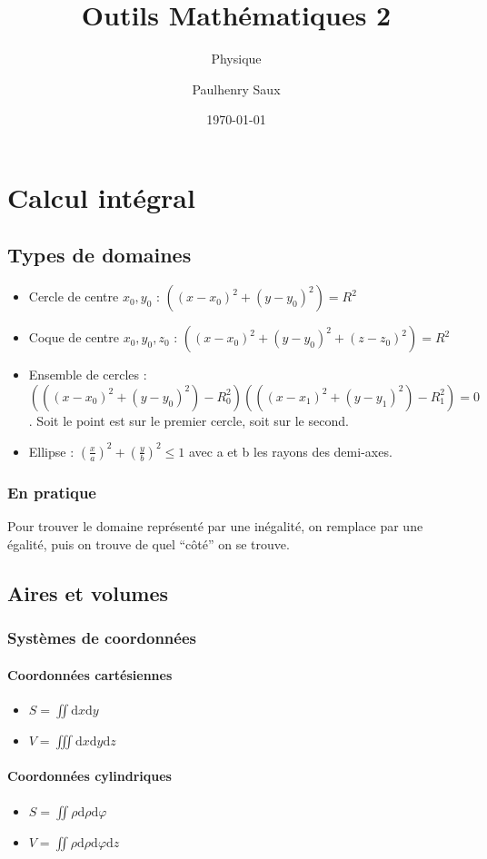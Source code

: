 \documentclass[french]{yLectureNote}
\title{Outils Mathématiques 2}
\subtitle{Physique}
\author{Paulhenry Saux}
\date{\today}
\newcommand{\dd}{\mathrm{d}}
\begin{document}
\setcounter{chapter}{1}
\chapter{Calcul intégral}
\section{Types de domaines}
\begin{itemize}
 \item Cercle de centre \(x_0, y_0\) : \(((x-x_0)^2+(y-y_0)^2) = R^2\)
  \item Coque de centre \(x_0, y_0, z_0\) : \(((x-x_0)^2+(y-y_0)^2+(z-z_0)^2) = R^2\)
  \item Ensemble de cercles : \((((x-x_0)^2+(y-y_0)^2)-R_0^2)(((x-x_1)^2+(y-y_1)^2)-R_1^2) = 0\). Soit le point est sur le premier cercle, soit sur le second.
  \item Ellipse : \((\frac{x}{a})^2+(\frac{y}{b})^2 \leq 1\) avec a et b les rayons des demi-axes.
\end{itemize}
\subsection{En pratique}
Pour trouver le domaine représenté par une inégalité, on remplace par une égalité, puis on trouve de quel ``c\^oté'' on se trouve.
\section{Aires et volumes}
\subsection{Systèmes de coordonnées}
\subsubsection{Coordonnées cartésiennes}
\begin{itemize}
 \item \(S = \iint \dd x\dd y\)
  \item \(V = \iiint \dd x\dd y\dd z\)
\end{itemize}
\subsubsection{Coordonnées cylindriques}
\begin{itemize}
 \item \(S = \iint \rho \dd \rho\dd \varphi\)
 \item \(V = \iint \rho \dd \rho\dd \varphi\dd z\)
\end{itemize}
\end{document}

